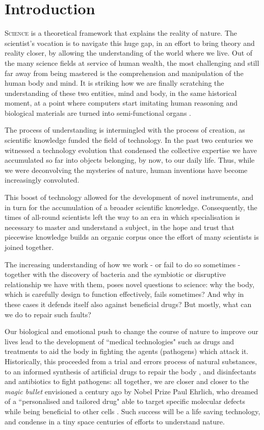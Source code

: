 \chapter{Introduction} \label{chapter:intro}

\lettrine{S}{cience} is a theoretical framework that explains the reality of nature. The scientist's vocation is to navigate this huge gap, in an effort to bring theory and reality closer, by allowing the understanding of the world where we live.
%
Out of the many science fields at service of human wealth, the most challenging and still far away from being mastered is the comprehension and manipulation of the human body and mind. It is striking how we are finally scratching the understanding of these two entities, mind and body, in the same historical moment, at a point where computers start imitating human reasoning \citep{AlphaGo,googleAIblog,Alom2019} and biological materials are turned into semi-functional organs \citep{Rossi2018}.

The process of understanding is intermingled with the process of creation, as scientific knowledge funded the field of technology. In the past two centuries we witnessed a technology evolution that condensed the collective expertise we have accumulated so far into objects belonging, by now, to our daily life. Thus, while we were deconvolving the mysteries of nature, human inventions have become increasingly convoluted.

This boost of technology allowed for the development of novel instruments, and in turn for the accumulation of a broader scientific knowledge. Consequently, the times of all-round scientists left the way to an era in which specialisation is necessary to master and understand a subject, in the hope and trust that piecewise knowledge builds an organic corpus once the effort of many scientists is joined together.

The increasing understanding of how we work - or fail to do so sometimes - together with the discovery of bacteria and the symbiotic or disruptive relationship we have with them, poses novel questions to science: why the body, which is carefully design to function effectively, fails sometimes? And why in these cases it defends itself also against beneficial drugs? But mostly, what can we do to repair such faults?

Our biological and emotional push to change the course of nature to improve our lives lead to the development of ``medical technologies" such as drugs and treatments to aid the body in fighting the agents (pathogens) which attack it. Historically, this proceeded from a trial and errors process of natural substances, to an informed synthesis of artificial drugs to repair the body \citep{Wishart2018}, and disinfectants \citep{WIDES_database} and antibiotics \citep{ABXdatabaseJhopkins} to fight pathogens: all together, we are closer and closer to the \emph{magic bullet} envisioned a century ago by Nobel Prize Paul Ehrlich, who dreamed of a ``personalised and tailored drug" able to target specific molecular defects while being beneficial to other cells \citep{Strebhardt2008}. Such success will be a life saving technology, and condense in a tiny space centuries of efforts to understand nature.

